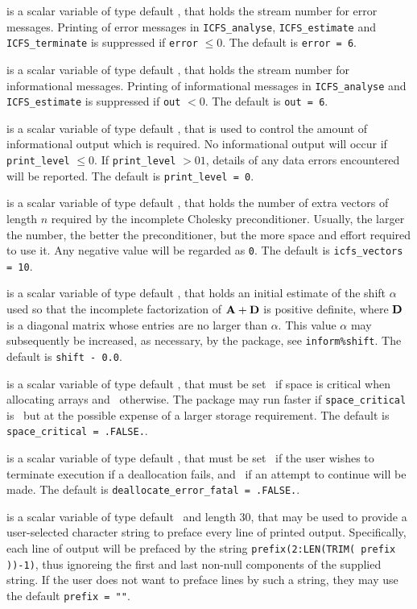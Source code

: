 \documentclass{galahad}
\newcommand{\packagename}{ICFS}
\begin{document}
\begin{description}

 is a scalar variable of type default \integer, that holds the
stream number for error messages. Printing of error messages in
{\tt \packagename\_analyse},
{\tt \packagename\_estimate}
and {\tt \packagename\_terminate}
is suppressed if {\tt error} $\leq 0$.
The default is {\tt error = 6}.

 is a scalar variable of type default \integer, that holds the
stream number for informational messages. Printing of informational messages in
{\tt \packagename\_analyse} and {\tt \packagename\_estimate}
is suppressed if {\tt out} $< 0$.
The default is {\tt out = 6}.

 is a scalar variable of type default \integer, that is used
to control the amount of informational output which is required. No
informational output will occur if {\tt print\_level} $\leq 0$. If
{\tt print\_level} $> 01$, details of any data errors encountered
will be reported.
The default is {\tt print\_level = 0}.

 is a scalar variable of type default \integer, that holds
the number of extra vectors of length $n$ required by the
incomplete Cholesky preconditioner.
Usually, the larger the number, the
better the preconditioner, but the more space and effort required to
use it. Any negative value will be regarded as {\tt 0}.
The default is {\tt icfs\_vectors = 10}.

 is a scalar variable of type default \realdp, that holds
an initial estimate of the shift $\alpha$ used so that the incomplete
factorization of ${\mathbf{A}} + {\mathbf{D}}$ is positive definite, where ${\mathbf{D}}$ is
a diagonal matrix whose entries are no larger than $\alpha$.
This value $\alpha$ may subsequently be increased, as necessary, by the
package, see {\tt inform\%shift}.
The default is {\tt shift - 0.0}.

 is a scalar variable of type default \logical,
that must be set \true\ if space is critical when allocating arrays
and  \false\ otherwise. The package may run faster if
{\tt space\_critical} is \false\ but at the possible expense of a larger
storage requirement. The default is {\tt space\_critical = .FALSE.}.

 is a scalar variable of type default \logical,
that must be set \true\ if the user wishes to terminate execution if
a deallocation  fails, and \false\ if an attempt to continue
will be made. The default is {\tt deallocate\_error\_fatal = .FALSE.}.

 is a scalar variable of type default \character\
and length 30, that may be used to provide a user-selected
character string to preface every line of printed output.
Specifically, each line of output will be prefaced by the string
{\tt prefix(2:LEN(TRIM( prefix ))-1)},
thus ignoreing the first and last non-null components of the
supplied string. If the user does not want to preface lines by such
a string, they may use the default {\tt prefix = ""}.

\end{description}
\end{document}
